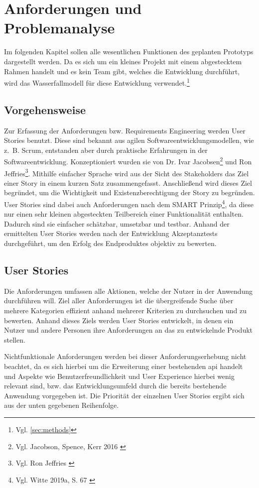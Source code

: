 \chapter{Anforderungen und Problemanalyse}
\label{ch:anforderungen}

Im folgenden Kapitel sollen alle wesentlichen Funktionen des geplanten Prototyps dargestellt werden.
Da es sich um ein kleines Projekt mit einem abgestecktem Rahmen handelt und es kein Team gibt, welches die Entwicklung durchführt, wird das Wasserfallmodell für diese Entwicklung verwendet.\footnote{Vgl. \ref{sec:methods}}


\section{Vorgehensweise}
\label{ref:requirementMethods}
Zur Erfassung der Anforderungen bzw. Requirements Engineering werden User Stories benutzt. Diese sind bekannt aus agilen Softwareentwicklungsmodellen, wie z. B. Scrum, entstanden aber durch praktische Erfahrungen in der Softwareentwicklung.
Konzeptioniert wurden sie von Dr. Ivar Jacobsen\footnote{Vgl. Jacobson, Spence, Kerr 2016 \cite{jacobson2016}} und Ron Jeffries\footnote{Vgl. Ron Jeffries \cite{jeffries2022}}.
Mithilfe einfacher Sprache wird aus der Sicht des Stakeholders das Ziel einer Story in einem kurzen Satz zusammengefasst.
Anschließend wird dieses Ziel begründet, um die Wichtigkeit und Existenzberechtigung der Story zu begründen.
User Stories sind dabei auch Anforderungen nach dem SMART Prinzip\footnote{Vgl. Witte 2019a, S. 67 \cite{witte2016}}, da diese nur einen sehr kleinen abgesteckten Teilbereich einer Funktionalität enthalten.
Dadurch sind sie einfacher schätzbar, umsetzbar und testbar. Anhand der ermittelten User Stories werden nach der Entwicklung Akzeptanztests durchgeführt, um den Erfolg des Endproduktes objektiv zu bewerten.

\section{User Stories}
\label{sec:userStories}
Die Anforderungen umfassen alle Aktionen, welche der Nutzer in der Anwendung durchführen will.
Ziel aller Anforderungen ist die übergreifende Suche über mehrere Kategorien effizient anhand mehrerer Kriterien zu durchsuchen und zu bewerten.
Anhand dieses Ziels werden User Stories entwickelt, in denen ein Nutzer und andere Personen ihre Anforderungen an das zu entwickelnde Produkt stellen.

Nichtfunktionale Anforderungen werden bei dieser Anforderungserhebung nicht beachtet, da es sich hierbei um die Erweiterung einer bestehenden \gls{api} handelt und Aspekte wie Benutzerfreundlichkeit und User Experience hierbei wenig relevant sind, bzw. das Entwicklungsumfeld durch die bereits bestehende Anwendung vorgegeben ist.
Die Priorität der einzelnen User Stories ergibt sich aus der unten gegebenen Reihenfolge.

